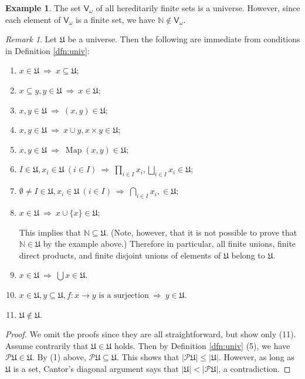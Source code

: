 \documentclass{surv-l}
\numberwithin{equation}{chapter}
\numberwithin{figure}{chapter}
\theoremstyle{plain}
\theoremstyle{definition}
\newtheorem{exm}[thm]{Example}
\theoremstyle{remark}
\newtheorem{rmk}[thm]{Remark}
\DeclareMathOperator{\Map}{Map}
\begin{document}
\begin{exm}
The set $\mathsf{V}_\omega$ of all hereditarily finite sets is a universe.
However, since each element of $\mathsf{V}_\omega$ is a finite set,
we have $\mathbb{N} \not\in \mathsf{V}_\omega$.
\pagebreak \end{exm}

\begin{rmk}\label{rmk:univ}
Let $\mathfrak{U}$ be a universe.
Then the following are immediate from conditions in Definition \ref{dfn:univ}:
\begin{enumerate}
\item
$x \in \mathfrak{U} \ \text{$\Rightarrow$}\  x \subseteq \mathfrak{U}$;
\item
$x \subseteq y, y \in \mathfrak{U} \ \text{$\Rightarrow$}\  x \in \mathfrak{U}$;
\item
$x,y \in \mathfrak{U} \ \text{$\Rightarrow$}\  (x, y) \in \mathfrak{U}$;
\item
$x, y \in \mathfrak{U} \ \text{$\Rightarrow$}\  x \cup y, x \times y \in  \mathfrak{U}$;
\item
$x, y \in \mathfrak{U} \ \text{$\Rightarrow$}\  \Map(x, y) \in \mathfrak{U}$;
\item
$I \in\mathfrak{U}, x_i \in \mathfrak{U}\ (i \in I) \ \text{$\Rightarrow$}\  \prod_{i\in I}x_i, \bigsqcup_{i\in I}x_i \in \mathfrak{U}$;
\item
$\emptyset \ne I \in\mathfrak{U}, x_i \in \mathfrak{U}\ (i \in I) \ \text{$\Rightarrow$}\  \bigcap_{i\in I}x_i, \in \mathfrak{U}$;
\item
$x \in \mathfrak{U} \ \text{$\Rightarrow$}\  x \cup \{x\} \in \mathfrak{U}$;

This implies that $\mathbb{N} \subseteq \mathfrak{U}$.
(Note, however, that it is not possible to prove that $\mathbb{N} \in \mathfrak{U}$ by the example above.)
Therefore in particular, all finite unions, finite direct products, and finite disjoint unions
of elements of $\mathfrak{U}$ belong to $\mathfrak{U}$.
\item
$x \in \mathfrak{U} \ \text{$\Rightarrow$}\  \bigcup x \in \mathfrak{U}$.
\item
$x \in \mathfrak{U}, y \subseteq \mathfrak{U}, f\colon x \to y \text{ is a surjection}\ \text{$\Rightarrow$}\  y \in \mathfrak{U}$.
\item
$\mathfrak{U} \not\in \mathfrak{U}$.
\end{enumerate}
\end{rmk}

\begin{proof}
We omit the proofs since they are all straightforward, but show only (11).
Assume contrarily that $\mathfrak{U} \in \mathfrak{U}$ holds.
Then by Definition \ref{dfn:univ} (5), we have $\mathcal{P}\mathfrak{U} \in \mathfrak{U}$.
By (1) above, $\mathcal{P}\mathfrak{U} \subseteq \mathfrak{U}$.
This shows that $|\mathcal{P}\mathfrak{U}| \le |\mathfrak{U}|$.
However, as long as $\mathfrak{U}$ is a set, Cantor's diagonal argument
says that $|\mathfrak{U}| < |\mathcal{P}\mathfrak{U}|$, a contradiction.
\end{proof}
\end{document}
